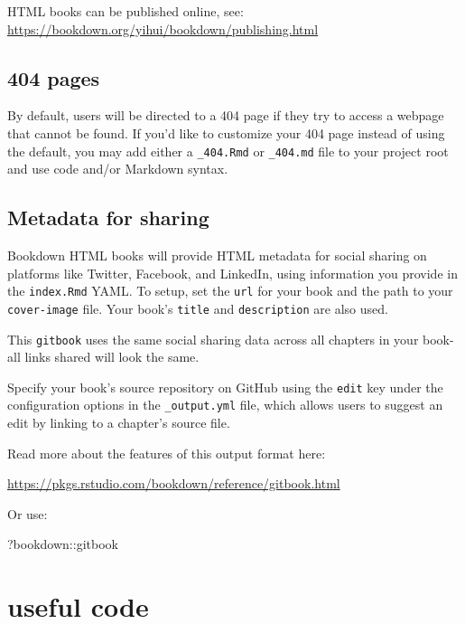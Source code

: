\documentclass[
]{book}
\newenvironment{Shaded}{\begin{snugshade}}{\end{snugshade}}
\newcommand{\NormalTok}[1]{#1}
\newcommand{\SpecialCharTok}[1]{\textcolor[rgb]{0.00,0.00,0.00}{#1}}
\theoremstyle{definition}
\theoremstyle{definition}
\theoremstyle{definition}
\theoremstyle{definition}
\theoremstyle{remark}
\begin{document}
HTML books can be published online, see: \url{https://bookdown.org/yihui/bookdown/publishing.html}

\hypertarget{pages}{%
\section{404 pages}\label{pages}}

By default, users will be directed to a 404 page if they try to access a webpage that cannot be found. If you'd like to customize your 404 page instead of using the default, you may add either a \texttt{\_404.Rmd} or \texttt{\_404.md} file to your project root and use code and/or Markdown syntax.

\hypertarget{metadata-for-sharing}{%
\section{Metadata for sharing}\label{metadata-for-sharing}}

Bookdown HTML books will provide HTML metadata for social sharing on platforms like Twitter, Facebook, and LinkedIn, using information you provide in the \texttt{index.Rmd} YAML. To setup, set the \texttt{url} for your book and the path to your \texttt{cover-image} file. Your book's \texttt{title} and \texttt{description} are also used.

This \texttt{gitbook} uses the same social sharing data across all chapters in your book- all links shared will look the same.

Specify your book's source repository on GitHub using the \texttt{edit} key under the configuration options in the \texttt{\_output.yml} file, which allows users to suggest an edit by linking to a chapter's source file.

Read more about the features of this output format here:

\url{https://pkgs.rstudio.com/bookdown/reference/gitbook.html}

Or use:

\begin{Shaded}
\begin{Highlighting}[]
\NormalTok{?bookdown}\SpecialCharTok{::}\NormalTok{gitbook}
\end{Highlighting}
\end{Shaded}

\hypertarget{useful-code}{%
\chapter{useful code}\label{useful-code}}
\end{document}
